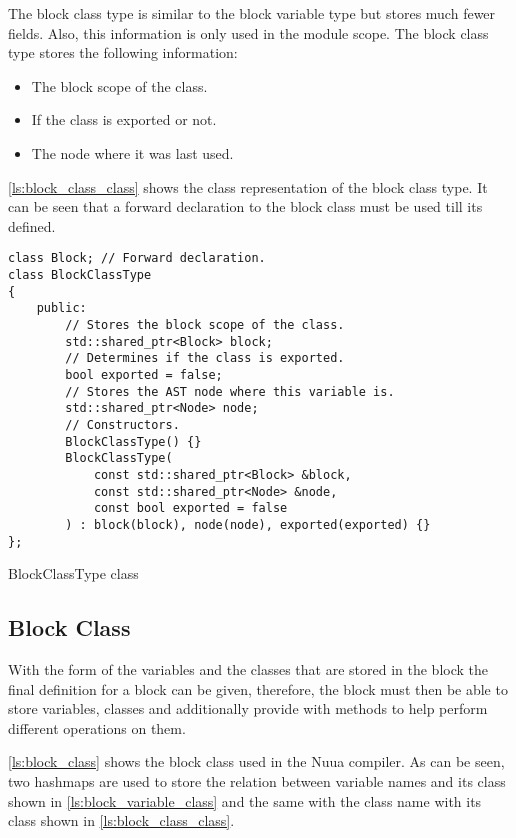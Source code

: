 The block class type is similar to the block variable type but stores much fewer fields. Also, this information is only used in the module scope.
The block class type stores the following information:

\begin{itemize}
    \item The block scope of the class.
    \item If the class is exported or not.
    \item The node where it was last used.
\end{itemize}

\autoref{ls:block_class_class} shows the class representation of the block class type. It can be seen that a forward declaration to
the block class must be used till its defined.

\begin{listing}[H]
\begin{verbatim}
class Block; // Forward declaration.
class BlockClassType
{
    public:
        // Stores the block scope of the class.
        std::shared_ptr<Block> block;
        // Determines if the class is exported.
        bool exported = false;
        // Stores the AST node where this variable is.
        std::shared_ptr<Node> node;
        // Constructors.
        BlockClassType() {}
        BlockClassType(
            const std::shared_ptr<Block> &block,
            const std::shared_ptr<Node> &node,
            const bool exported = false
        ) : block(block), node(node), exported(exported) {}
};
\end{verbatim}
\caption{BlockClassType class}
\label{ls:block_class_class}
\end{listing}

\subsection{Block Class}

With the form of the variables and the classes that are stored in the block the final definition for a block can be given, therefore, the block must
then be able to store variables, classes and additionally provide with methods to help perform different operations on them.

\autoref{ls:block_class} shows the block class used in the Nuua compiler. As can be seen, two hashmaps are used to store the relation between
variable names and its class shown in \autoref{ls:block_variable_class} and the same with the class name with its class shown in \autoref{ls:block_class_class}.

